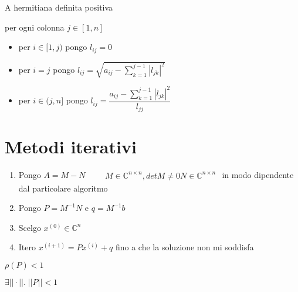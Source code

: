 \askip

 A hermitiana definita positiva

\askip

\begin{proc}[Fattorizzazione $ LL^H $]\label{proc:fattorizzazioneLLH}
per ogni colonna $ j \in [1,n] $
\begin{itemize}
\item per $ i \in [1,j) $ pongo $ l_{ij} = 0 $
\item per $ i = j $ pongo $ l_{ij} = \sqrt{a_{ij} - \sum_{k=1}^{j-1}|l_{jk}|^2} $
\item per $ i \in (j,n] $ pongo $ l_{ij} = \dfrac{a_{ij} - \sum_{k=1}^{j-1}|l_{jk}|^2}{l_{jj}} $
\end{itemize}
\end{proc}








\section{Metodi iterativi}
\begin{proc}\label{proc:schemaiterativosistemilineari}
\begin{enumerate}
\item Pongo $ A = M - N \qquad \begin{array}{l}
M \in \mathbb{C}^{n \times n}, det M \neq 0
N \in \mathbb{C}^{n \times n}
\end{array} $ in modo dipendente dal particolare algoritmo
\item Pongo $ P = M^{-1}N $ e $ q = M^{-1}b $
\item Scelgo $ x^{(0)} \in \mathbb{C}^n $
\item Itero $ x^{(i+1)} = Px^{(i)} + q $ fino a che la soluzione non mi soddisfa
\end{enumerate}
\end{proc}

\askip

 $ \rho(P) < 1 $

\askip

 $ \exists || \cdot ||. \; || P || < 1 $




